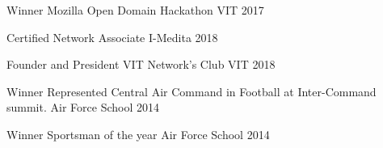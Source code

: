 \documentclass[11pt, a4paper]{awesome-cv}
\begin{document}
\begin{cvhonors}

  \cvhonor
    {Winner} %
    {Mozilla Open Domain Hackathon} %
    {VIT} %
    {2017} %

  \cvhonor
    {Certified} %
    {Network Associate} %
    {I-Medita} %
    {2018} %

  \cvhonor
    {Founder and President} %
    {VIT Network's Club} %
    {VIT} %
    {2018} %

  \cvhonor
    {Winner} %
    {Represented Central Air Command in Football at Inter-Command summit.} %
    {Air Force School} %
    {2014} %

  \cvhonor
    {Winner} %
    {Sportsman of the year} %
    {Air Force School} %
    {2014} %

\end{cvhonors}

\end{document}
